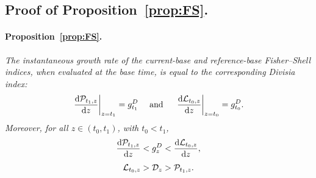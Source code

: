 \documentclass[12pt,a4paper]{article}
\begin{document}
\begin{appendices}

\subsection{Proof of Proposition~\ref{prop:FS}.} \label{app:FS}

\paragraph{Proposition~\ref{prop:FS}.}
{\it The instantaneous growth rate of the current-base and reference-base Fisher--Shell indices, when evaluated at the base time, is equal to the corresponding Divisia index:}
\begin{equation}\label{eq:FBFS}
\left. \frac{\mathrm{d}  {\cal P}_{t_1,z}}{\mathrm{d} z} \right|_{z=t_1} =  g^{D}_{t_1} 
\ \ \ \ \text{and}\ \ \ \ 
\left. \frac{\mathrm{d}  {\cal L}_{t_0,z}}{\mathrm{d} z} \right|_{z=t_0} = g^{D}_{t_0} .
\end{equation}
{\it Moreover, for all \( z \in (t_0, t_1) \), with \( t_0 < t_1 \),}
\begin{equation}\label{eq:FBFSvsDivisia}
\frac{\mathrm{d}  {\cal P}_{t_1,z}}{\mathrm{d} z}  <  g^{D}_{z} < 
\frac{\mathrm{d}  {\cal L}_{t_0,z}}{\mathrm{d} z},
\end{equation}
$${\cal L}_{t_0,z} > {\cal D}_{z}  > {\cal P}_{t_1,z}.$$


\end{appendices}
\end{document}
